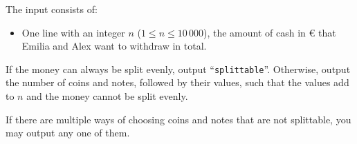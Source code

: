 


\begin{Input}
    The input consists of:
    \begin{itemize}
        \item One line with an integer $n$ ($1\leq n\leq 10\,000$), the amount of
    cash in € that Emilia and Alex want to withdraw in total.
    \end{itemize}
\end{Input}

\begin{Output}
    If the money can always be split evenly, output ``\texttt{splittable}''.
    Otherwise, output the number of
    coins and notes, followed by their values, such that the values add to $n$
    and the money cannot be split evenly.

    If there are multiple ways of choosing coins and notes that are not splittable, you may output any one of them.
\end{Output}
